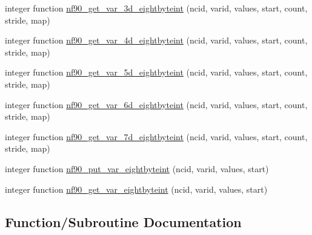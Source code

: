 \begin{DoxyCompactItemize}
\item 
integer function \hyperlink{netcdf__eightbyte_8f90_a8fa455e882db95833737abdb421cf413}{nf90\+\_\+get\+\_\+var\+\_\+3d\+\_\+eightbyteint} (ncid, varid, values, start, count, stride, map)
\item 
integer function \hyperlink{netcdf__eightbyte_8f90_a13a8c596ce2cddbdd93d52adba8ed05f}{nf90\+\_\+get\+\_\+var\+\_\+4d\+\_\+eightbyteint} (ncid, varid, values, start, count, stride, map)
\item 
integer function \hyperlink{netcdf__eightbyte_8f90_aad2961aebfb639255928956049693640}{nf90\+\_\+get\+\_\+var\+\_\+5d\+\_\+eightbyteint} (ncid, varid, values, start, count, stride, map)
\item 
integer function \hyperlink{netcdf__eightbyte_8f90_a98c01b59edd61dfa5608ab76dbac07ef}{nf90\+\_\+get\+\_\+var\+\_\+6d\+\_\+eightbyteint} (ncid, varid, values, start, count, stride, map)
\item 
integer function \hyperlink{netcdf__eightbyte_8f90_aa72f717e4c1e4bba1378e0c40c310ce3}{nf90\+\_\+get\+\_\+var\+\_\+7d\+\_\+eightbyteint} (ncid, varid, values, start, count, stride, map)
\item 
integer function \hyperlink{netcdf__eightbyte_8f90_a19465ca23067ad30103744429fb4bb95}{nf90\+\_\+put\+\_\+var\+\_\+eightbyteint} (ncid, varid, values, start)
\item 
integer function \hyperlink{netcdf__eightbyte_8f90_acdfad8c826daa4962a18f239a1495bf3}{nf90\+\_\+get\+\_\+var\+\_\+eightbyteint} (ncid, varid, values, start)
\end{DoxyCompactItemize}


\subsection{Function/\+Subroutine Documentation}
\mbox{\label{netcdf__eightbyte_8f90_ac7f1c7b59c40bf98465096bf2de86167}} 
